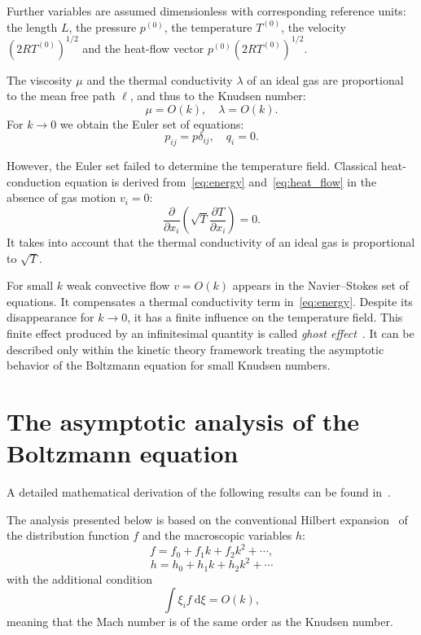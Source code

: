 \documentclass[english,a4paper,10pt]{article}
\newcommand{\dd}{\:\mathrm{d}}
\newcommand{\pder}[2][]{\frac{\partial#1}{\partial#2}}
\begin{document}
Further variables are assumed dimensionless with corresponding reference units:
the length \(L\), the pressure \(p^{(0)}\), the temperature \(T^{(0)}\),
the velocity \((2RT^{(0)})^{1/2}\) and the heat-flow vector \(p^{(0)}(2RT^{(0)})^{1/2}\).

The viscosity \(\mu\) and the thermal conductivity \(\lambda\) of an ideal gas
are proportional to the mean free path \(\ell\), and thus to the Knudsen number:
\begin{equation}
	\mu = O(k), \quad \lambda = O(k).
\end{equation}
For \(k\to0\) we obtain the Euler set of equations:
\begin{equation}
	p_{ij} = p\delta_{ij}, \quad q_i = 0.
\end{equation}

However, the Euler set failed to determine the temperature field.
Classical heat-conduction equation is derived from~\eqref{eq:energy} and~\eqref{eq:heat_flow}
in the absence of gas motion \(v_i = 0\):
\begin{equation}\label{eq:heat_equation}
	\pder{x_i}\left(\sqrt{T}\pder[T]{x_i}\right) = 0.
\end{equation}
It takes into account that the thermal conductivity of an ideal gas is proportional to \(\sqrt{T}\).

For small \(k\) weak convective flow \(v = O(k)\) appears in the Navier--Stokes set of equations.
It compensates a thermal conductivity term in~\eqref{eq:energy}.
Despite its disappearance for \(k\to0\), it has a finite influence on the temperature field.
This finite effect produced by an infinitesimal quantity is called \textit{ghost effect}~\cite{Sone2002}.
It can be described only within the kinetic theory framework treating the asymptotic behavior of
the Boltzmann equation for small Knudsen numbers.

\section{The asymptotic analysis of the Boltzmann equation}
A detailed mathematical derivation of the following results can be found in~\cite{Sone2002, Sone2007}.

The analysis presented below is based on the conventional Hilbert expansion~\cite{Hilbert1912}
of the distribution function \(f\) and the macroscopic variables \(h\):
\[ f = f_0 + f_1k + f_2k^2 + \cdots, \]
\[ h = h_0 + h_1k + h_2k^2 + \cdots \]
with the additional condition
\begin{equation}\label{eq:Mach_constraint}
	\int\xi_if\dd\xi = O(k),
\end{equation}
meaning that the Mach number is of the same order as the Knudsen number.
\end{document}
